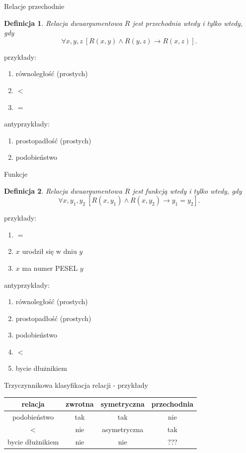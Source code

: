 \documentclass{beamer}
\newtheorem{definicja}{Definicja}
\begin{document}
\begin{frame}{Relacje przechodnie}
%
\begin{definicja}
Relacja dwuargumentowa $R$ jest \emph{przechodnia} wtedy i tylko wtedy, gdy $$\forall x,y,z ~[R(x,y) \land R(y, z) \to R(x,z)].$$
\end{definicja}
%
przykłady:
\begin{enumerate}
\item równoległość (prostych)
\item $<$
\item $=$
\end{enumerate}
%
antyprzykłady:
\begin{enumerate}
\item prostopadłość (prostych)
\item podobieństwo
\end{enumerate}
\end{frame}

\begin{frame}{Funkcje}
%
\begin{definicja}
Relacja dwuargumentowa $R$ jest \emph{funkcją} wtedy i tylko wtedy, gdy $$\forall x,y_{1},y_{2} ~[R(x,y_{1}) \land R(x, y_{2}) \to y_{1}=y_{2}].$$
\end{definicja}
%
przykłady:
\begin{enumerate}
\item $=$
\item $x$ urodził się w dniu $y$
\item $x$ ma numer PESEL $y$
\end{enumerate}
%
antyprzykłady:
\begin{enumerate}
\item równoległość (prostych)
\item prostopadłość (prostych)
\item podobieństwo
\item $<$
\item bycie dłużnikiem
\end{enumerate}
\end{frame}

\begin{frame}{Trzyczynnikowa klasyfikacja relacji  - przykłady}
%
\begin{center}
\begin{table}
\begin{tabular}{|c||c|c|c|}
\hline 
\textbf{relacja} & \textbf{zwrotna} & \textbf{symetryczna}  & \textbf{przechodnia} \\
\hline
podobieństwo & tak & tak & nie \\ 
\hline
$<$ & nie & asymetryczna & tak\\
\hline
bycie dłużnikiem & nie & nie & ??? \\
\hline
\end{tabular}
\end{table}
\end{center}
\end{frame} 
\end{document}
